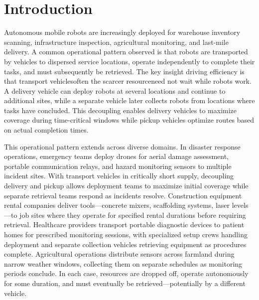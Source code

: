 \documentclass[sigconf]{acmart}
\begin{document}


\maketitle

\section{Introduction}

Autonomous mobile robots are increasingly deployed for warehouse inventory scanning, infrastructure inspection, agricultural monitoring, and last-mile delivery. A common operational pattern observed is that robots are transported by vehicles to dispersed service locations, operate independently to complete their tasks, and must subsequently be retrieved. The key insight driving efficiency is that transport vehicles\textemdash often the scarcer resource\textemdash need not wait while robots work. A delivery vehicle can deploy robots at several locations and continue to additional sites, while a separate vehicle later collects robots from locations where tasks have concluded. This decoupling enables delivery vehicles to maximize coverage during time-critical windows while pickup vehicles optimize routes based on actual completion times.

This operational pattern extends across diverse domains. In disaster response operations, emergency teams deploy drones for aerial damage assessment, portable communication relays, and hazard monitoring sensors to multiple incident sites. With transport vehicles in critically short supply, decoupling delivery and pickup allows deployment teams to maximize initial coverage while separate retrieval teams respond as incidents resolve. Construction equipment rental companies deliver tools---concrete mixers, scaffolding systems, laser levels---to job sites where they operate for specified rental durations before requiring retrieval. Healthcare providers transport portable diagnostic devices to patient homes for prescribed monitoring sessions, with specialized setup crews handling deployment and separate collection vehicles retrieving equipment as procedures complete. Agricultural operations distribute sensors across farmland during narrow weather windows, collecting them on separate schedules as monitoring periods conclude. In each case, resources are dropped off, operate autonomously for some duration, and must eventually be retrieved---potentially by a different vehicle.
\end{document}
